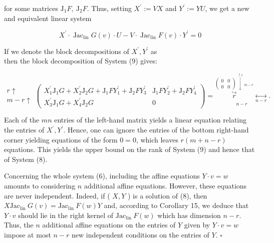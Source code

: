 \documentclass[10pt]{article}
\begin{document}
for some matrices $\mathrm{J}_{1} F, \mathrm{~J}_{2} F$. Thus, setting $X^{\prime}:=V X$ and $Y^{\prime}:=Y U$, we get a new and equivalent linear system


\begin{equation*}
X^{\prime} \cdot \operatorname{Jac}_{\operatorname{lin}} G(v) \cdot U-V \cdot \operatorname{Jac}_{\operatorname{lin}} F(v) \cdot Y^{\prime}=0 \tag{9}
\end{equation*}


If we denote the block decompositions of $X^{\prime}, Y^{\prime}$ as\\
then the block decomposition of System (9) gives:

$$
\begin{array}{rc}
r \uparrow \\
m-r \uparrow
\end{array}\left(\begin{array}{cc}
X_{1}^{\prime} \mathrm{J}_{1} G+X_{2}^{\prime} \mathrm{J}_{2} G+\mathrm{J}_{1} F Y_{1}^{\prime}+\mathrm{J}_{2} F Y_{3}^{\prime} & \mathrm{J}_{1} F Y_{2}^{\prime}+\mathrm{J}_{2} F Y_{4}^{\prime} \\
X_{3}^{\prime} \mathrm{J}_{1} G+X_{4}^{\prime} \mathrm{J}_{2} G & 0
\end{array}\right)=\underset{n-r}{\stackrel{\left(\begin{array}{cc}
0 & 0 \\
0 & 0
\end{array}\right) \stackrel{\uparrow r}{\downarrow}{ }_{m-r}}{\stackrel{\hookrightarrow}{r}} \underset{n-r}{\longleftrightarrow}} .
$$

Each of the $m n$ entries of the left-hand matrix yields a linear equation relating the entries of $X^{\prime}, Y^{\prime}$. Hence, one can ignore the entries of the bottom right-hand corner yielding equations of the form $0=0$, which leaves $r(m+n-r)$ equations. This yields the upper bound on the rank of System (9) and hence that of System (8).

Concerning the whole system (6), including the affine equations $Y \cdot v=w$ amounts to considering $n$ additional affine equations. However, these equations are never independent. Indeed, if ( $X, Y$ ) is a solution of (8), then $X \mathrm{Jac}_{\text {lin }} G(v)=\mathrm{Jac}_{\text {lin }} F(w) Y$ and, according to Corollary 15, we deduce that $Y \cdot v$ should lie in the right kernel of $\mathrm{Jac}_{\text {lin }} F(w)$ which has dimension $n-r$. Thus, the $n$ additional affine equations on the entries of $Y$ given by $Y \cdot v=w$ impose at most $n-r$ new independent conditions on the entries of $Y$. \(\square\)
\end{document}
